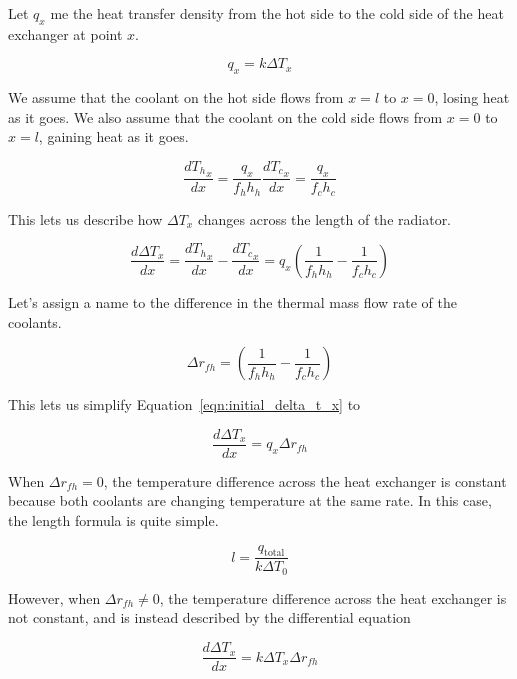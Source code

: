 \documentclass{article}
\numberwithin{equation}{subsection}
\theoremstyle{remark}
\newcommand{\qtotal}{q_{\mathrm{total}}}
\newcommand{\DeltaT}{\Delta{}T}
\newcommand{\Deltarfh}{\Delta{}r_{fh}}
\begin{document}
Let \(q_{x}\) me the heat transfer density from the hot side to the cold side of the heat exchanger at point \(x\).

\begin{equation}
q_{x} = k \DeltaT_{x}
\end{equation}

We assume that the coolant on the hot side flows from \(x = l\) to \(x = 0\), losing heat as it goes.
We also assume that the coolant on the cold side flows from \(x = 0\) to \(x = l\), gaining heat as it goes.

\begin{equation}
\frac{d{T_{h}}_{x}}{dx} = \frac{q_{x}}{f_{h} h_{h}}
\frac{d{T_{c}}_{x}}{dx} = \frac{q_{x}}{f_{c} h_{c}}
\end{equation}

This lets us describe how \(\DeltaT_{x}\) changes across the length of the radiator.

\begin{equation}
\label{eqn:initial_delta_t_x}
\frac{d\DeltaT_{x}}{dx} = \frac{d{T_{h}}_{x}}{dx} - \frac{d{T_{c}}_{x}}{dx} = q_{x} \left(\frac{1}{f_{h} h_{h}} - \frac{1}{f_{c} h_{c}}\right)
\end{equation}

Let's assign a name to the difference in the thermal mass flow rate of the coolants.

\begin{equation}
\Deltarfh = \left(\frac{1}{f_{h} h_{h}} - \frac{1}{f_{c} h_{c}}\right)
\end{equation}

This lets us simplify Equation~\ref{eqn:initial_delta_t_x} to

\begin{equation}
\frac{d\DeltaT_{x}}{dx} = q_{x} \Deltarfh
\end{equation}

When \(\Deltarfh = 0\), the temperature difference across the heat exchanger is constant because both coolants are changing temperature at the same rate.
In this case, the length formula is quite simple.

\begin{equation}
l = \frac{\qtotal}{k \DeltaT_{0}}
\end{equation}

However, when \(\Deltarfh \ne 0\), the temperature difference across the heat exchanger is not constant, and is instead described by the differential equation

\begin{equation}
\frac{d\DeltaT_{x}}{dx} = k \DeltaT_{x} \Deltarfh
\end{equation}
\end{document}
